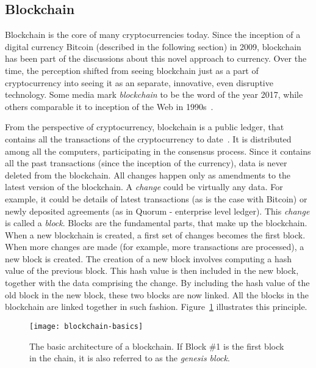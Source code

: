 \subsection{Blockchain}
% 
Blockchain is the core of many cryptocurrencies today. Since the inception of a digital currency Bitcoin (described in the following section) in 2009, blockchain has been part of the discussions about this novel approach to currency. Over the time, the perception shifted from seeing blockchain just as a part of cryptocurrency into seeing it as an separate, innovative, even disruptive technology. Some media mark \textit{blockchain} to be the word of the year 2017\footnotemark, while others comparable it to inception of the Web in 1990s~\cite[p. 14]{Swan2015BlockchainEconomy}.
% 

From the perspective of cryptocurrency, blockchain is a public ledger, that contains all the transactions of the cryptocurrency to date~\cite{Swan2015BlockchainEconomy}. It is distributed among all the computers, participating in the consensus process. Since it contains all the past transactions (since the inception of the currency), data is never deleted from the blockchain. All changes happen only as amendments to the latest version of the blockchain. A \textit{change} could be virtually any data. For example, it could be details of latest transactions (as is the case with Bitcoin) or newly deposited agreements (as in Quorum - enterprise level ledger\footnotemark). This \textit{change} is called a \textit{block}. Blocks are the fundamental parts, that make up the blockchain. When a new blockchain is created, a first set of changes becomes the first block.
% 
% 
When more changes are made (for example, more transactions are processed), a new block is created. The creation of a new block involves computing a hash value of the previous block. This hash value is then included in the new block, together with the data comprising the change. By including the hash value of the old block in the new block, these two blocks are now linked. All the blocks in the blockchain are linked together in such fashion. Figure~\ref{fig:blockch-basics} illustrates this principle. 
% 
\begin{figure}[ht]
    \centering
    \texttt{[image: blockchain-basics]}
    \caption{The basic architecture of a blockchain. If Block \#1 is the first block in the chain, it is also referred to as the \textit{genesis block}.}
    \label{fig:blockch-basics}
\end{figure}

